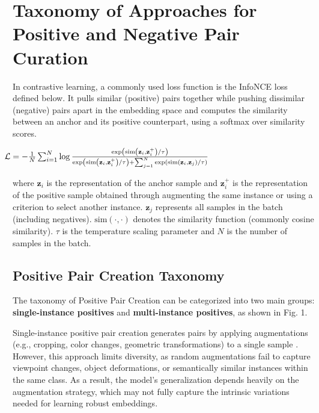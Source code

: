 \section{Taxonomy of Approaches for Positive and Negative Pair Curation}
\label{sec: Taxonomy}



In contrastive learning, a commonly used loss function is the InfoNCE loss defined below. It pulls similar (positive) pairs together while pushing dissimilar (negative) pairs apart in the embedding space and computes the similarity between an anchor and its positive counterpart, using a softmax over similarity scores. %


\begin{math}
\hspace{-1em}
\centering
 \mathcal{L} = 
- \frac{1}{N} \sum_{i=1}^{N} \log 
\frac{
\exp\left(\text{sim}\left(\mathbf{z}_i, \mathbf{z}_i^+\right)/\tau\right)
}{
\exp\left(\text{sim}\left(\mathbf{z}_i, \mathbf{z}_i^+\right)/\tau\right) 
+ \sum_{j=1}^{N} 
\exp\left(\text{sim}\left(\mathbf{z}_i, \mathbf{z}_j\right)/\tau\right)}
\end{math}


where \( \mathbf{z}_i \) is the representation of the anchor sample and \( \mathbf{z}_i^+ \) is the representation of the positive sample obtained through augmenting the same instance or using a criterion to select another instance. \( \mathbf{z}_j \) represents all samples in the batch (including negatives). \( \text{sim}(\cdot, \cdot) \) denotes the similarity function (commonly cosine similarity). \( \tau \) is the temperature scaling parameter and \( N \) is the number of samples in the batch.


\subsection{Positive Pair Creation Taxonomy}
The taxonomy of Positive Pair Creation can be categorized into two main groups: \textbf{single-instance positives} and \textbf{multi-instance positives}, as shown in Fig. 1.


Single-instance positive pair creation generates pairs by applying augmentations (e.g., cropping, color changes, geometric transformations) to a single sample \cite{chen2020simple}.  However, this approach limits diversity, as random augmentations fail to capture viewpoint changes, object deformations, or semantically similar instances within the same class. As a result, the model's generalization depends heavily on the augmentation strategy, which may not fully capture the intrinsic variations needed for learning robust embeddings.


